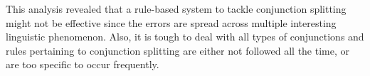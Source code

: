     This analysis revealed that a rule-based system to tackle conjunction splitting might not be effective since the errors are spread across multiple interesting linguistic phenomenon. Also, it is tough to deal with all types of conjunctions and rules pertaining to conjunction splitting are either not followed all the time, or are too specific to occur frequently.




